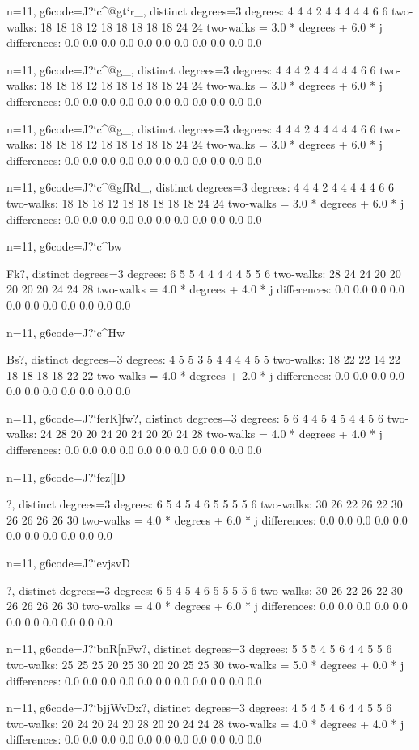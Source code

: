 {{{{{{{{{{{{{{{{n=11, g6code=J?`c^@gt`r_, distinct degrees=3
degrees: 4 4 4 2 4 4 4 4 4 6 6 
two-walks: 18 18 18 12 18 18 18 18 18 24 24 
two-walks = 3.0 * degrees + 6.0 * j
differences: 0.0 0.0 0.0 0.0 0.0 0.0 0.0 0.0 0.0 0.0 0.0 

n=11, g6code=J?`c^@g\cr_, distinct degrees=3
degrees: 4 4 4 2 4 4 4 4 4 6 6 
two-walks: 18 18 18 12 18 18 18 18 18 24 24 
two-walks = 3.0 * degrees + 6.0 * j
differences: 0.0 0.0 0.0 0.0 0.0 0.0 0.0 0.0 0.0 0.0 0.0 

n=11, g6code=J?`c^@g\St_, distinct degrees=3
degrees: 4 4 4 2 4 4 4 4 4 6 6 
two-walks: 18 18 18 12 18 18 18 18 18 24 24 
two-walks = 3.0 * degrees + 6.0 * j
differences: 0.0 0.0 0.0 0.0 0.0 0.0 0.0 0.0 0.0 0.0 0.0 

n=11, g6code=J?`c^@gfRd_, distinct degrees=3
degrees: 4 4 4 2 4 4 4 4 4 6 6 
two-walks: 18 18 18 12 18 18 18 18 18 24 24 
two-walks = 3.0 * degrees + 6.0 * j
differences: 0.0 0.0 0.0 0.0 0.0 0.0 0.0 0.0 0.0 0.0 0.0 

n=11, g6code=J?`c^bw}Fk?, distinct degrees=3
degrees: 6 5 5 4 4 4 4 4 5 5 6 
two-walks: 28 24 24 20 20 20 20 20 24 24 28 
two-walks = 4.0 * degrees + 4.0 * j
differences: 0.0 0.0 0.0 0.0 0.0 0.0 0.0 0.0 0.0 0.0 0.0 

n=11, g6code=J?`c^Hw}Bs?, distinct degrees=3
degrees: 4 5 5 3 5 4 4 4 4 5 5 
two-walks: 18 22 22 14 22 18 18 18 18 22 22 
two-walks = 4.0 * degrees + 2.0 * j
differences: 0.0 0.0 0.0 0.0 0.0 0.0 0.0 0.0 0.0 0.0 0.0 

n=11, g6code=J?`ferK]fw?, distinct degrees=3
degrees: 5 6 4 4 5 4 5 4 4 5 6 
two-walks: 24 28 20 20 24 20 24 20 20 24 28 
two-walks = 4.0 * degrees + 4.0 * j
differences: 0.0 0.0 0.0 0.0 0.0 0.0 0.0 0.0 0.0 0.0 0.0 

n=11, g6code=J?`fez[|D{?, distinct degrees=3
degrees: 6 5 4 5 4 6 5 5 5 5 6 
two-walks: 30 26 22 26 22 30 26 26 26 26 30 
two-walks = 4.0 * degrees + 6.0 * j
differences: 0.0 0.0 0.0 0.0 0.0 0.0 0.0 0.0 0.0 0.0 0.0 

n=11, g6code=J?`evjsvD{?, distinct degrees=3
degrees: 6 5 4 5 4 6 5 5 5 5 6 
two-walks: 30 26 22 26 22 30 26 26 26 26 30 
two-walks = 4.0 * degrees + 6.0 * j
differences: 0.0 0.0 0.0 0.0 0.0 0.0 0.0 0.0 0.0 0.0 0.0 

n=11, g6code=J?`bnR[nFw?, distinct degrees=3
degrees: 5 5 5 4 5 6 4 4 5 5 6 
two-walks: 25 25 25 20 25 30 20 20 25 25 30 
two-walks = 5.0 * degrees + 0.0 * j
differences: 0.0 0.0 0.0 0.0 0.0 0.0 0.0 0.0 0.0 0.0 0.0 

n=11, g6code=J?`bjjWvDx?, distinct degrees=3
degrees: 4 5 4 5 4 6 4 4 5 5 6 
two-walks: 20 24 20 24 20 28 20 20 24 24 28 
two-walks = 4.0 * degrees + 4.0 * j
differences: 0.0 0.0 0.0 0.0 0.0 0.0 0.0 0.0 0.0 0.0 0.0 

}}}}}}}}}}}}}}}}
